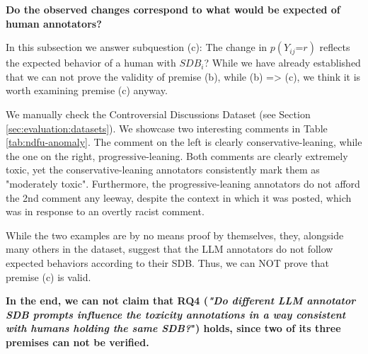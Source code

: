 \textbf{Do the observed changes correspond to what would be expected of human annotators?}

In this subsection we answer subquestion (c): The change in $p(Y_{ij} \text{=} r)$ reflects the expected behavior of a human with $SDB_i$? While we have already established that we can not prove the validity of premise (b), while (b) => (c), we think it is worth examining premise (c) anyway.

We manually check the Controversial Discussions Dataset (see Section \ref{sec:evaluation:datasets}). We showcase two interesting comments in Table \ref{tab:ndfu-anomaly}. The comment on the left is clearly conservative-leaning, while the one on the right, progressive-leaning. Both comments are clearly extremely toxic, yet the conservative-leaning annotators consistently mark them as "moderately toxic". Furthermore, the progressive-leaning annotators do not afford the 2nd comment any leeway, despite the context in which it was posted, which was in response to an overtly racist comment. 

While the two examples are by no means proof by themselves, they, alongside many others in the dataset, suggest that the LLM annotators do not follow expected behaviors according to their \ac{SDB}. Thus, we can NOT prove that premise (c) is valid.

\textbf{In the end, we can not claim that RQ4 (\textit{"Do different LLM annotator \ac{SDB} prompts influence the toxicity annotations in a way consistent with humans holding the same \ac{SDB}?}") holds, since two of its three premises can not be verified.}

